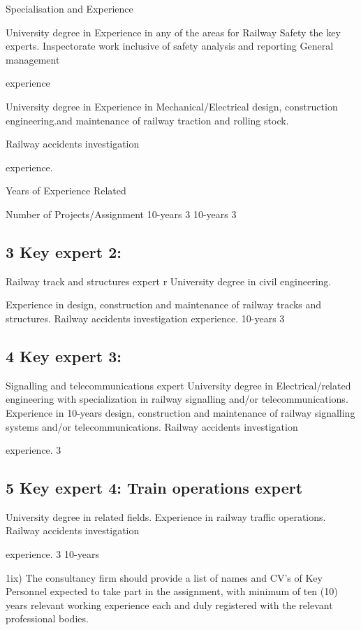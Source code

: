 Specialisation and Experience

University degree in Experience in any of the areas for Railway Safety
the key experts. Inspectorate work inclusive of safety analysis and
reporting General management

experience

University degree in Experience in Mechanical/Electrical design,
construction engineering.and maintenance of railway traction and rolling
stock.

Railway accidents investigation

experience.

Years of Experience Related

Number of Projects/Assignment 10-years 3 10-years 3

\subsection{3 Key expert 2:}\label{key-expert-2}

Railway track and structures expert r University degree in civil
engineering.

Experience in design, construction and maintenance of railway tracks and
structures. Railway accidents investigation experience. 10-years 3

\subsection{4 Key expert 3:}\label{key-expert-3}

Signalling and telecommunications expert University degree in
Electrical/related engineering with specialization in railway signalling
and/or telecommunications. Experience in 10-years design, construction
and maintenance of railway signalling systems and/or telecommunications.
Railway accidents investigation

experience. 3

\subsection{5 Key expert 4: Train operations
	expert}\label{key-expert-4-train-operations-expert}

University degree in related fields. Experience in railway traffic
operations. Railway accidents investigation

experience. 3 10-years

1ix) The consultancy firm should provide a list of names and CV's of Key
Personnel expected to take part in the assignment, with minimum of ten
(10) years relevant working experience each and duly registered with the
relevant professional bodies.

